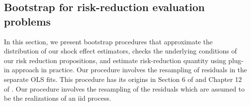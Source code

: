 \documentclass[11pt]{article}
\def\mc#1{\mathcal{#1}} %
\def\E#1{\mathrm{E}(#1)} %
\def\var#1{\mathrm{Var}(#1)} %
\theoremstyle{definition}
\newtheorem{remark}{Remark}
\begin{document}



 




\subsection{Bootstrap for risk-reduction evaluation problems}
\label{varbootstrap}


In this section, we present bootstrap procedures that approximate the distribution of our shock effect estimators, checks the underlying conditions of our risk reduction propositions, and estimate risk-reduction quantity using plug-in approach in practice. Our procedure involves the resampling of residuals in the separate OLS fits. This procedure has its origins in Section 6 of \citet{efron1986bootstrap} and Chapter 12 of \cite{kilian2017structural}. Our procedure involves the resampling of the residuals which are assumed to be the realizations of an iid process.
\end{document}
